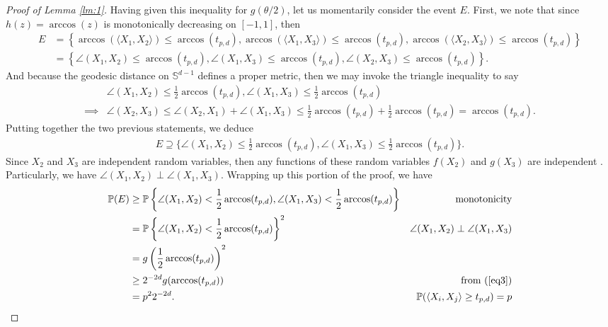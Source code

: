 \documentclass{article}
\begin{document}
\begin{proof}[Proof of Lemma \ref{lm:1}]
Having given this inequality for $g(\theta/2)$, let us momentarily consider the event $E$. First, we note that since $h(z) = \arccos(z)$ is monotonically decreasing on $[-1, 1]$, then
\begin{align*}
    E &= \left\{ \arccos(\langle X_1, X_2 \rangle) \leq \arccos(t_{p,d}), \arccos(\langle X_1, X_3 \rangle) \leq \arccos(t_{p,d}), \arccos(\langle X_2, X_3 \rangle) \leq  \arccos(t_{p,d}) \right\}\\
    &= \left\{ \angle(X_1, X_2) \leq \arccos(t_{p,d}), \angle(X_1, X_3) \leq \arccos(t_{p,d}), \angle(X_2, X_3) \leq  \arccos(t_{p,d}) \right\}.
\end{align*}
And because the geodesic distance on $\mathbb{S}^{d-1}$ defines a proper metric, then we may invoke the triangle inequality to say
\begin{align*}
    &\angle(X_1, X_2) \leq \frac{1}{2}\arccos(t_{p,d}), \angle (X_1, X_3) \leq \frac{1}{2}\arccos(t_{p,d})\\
    \implies & \angle(X_2, X_3) \leq \angle(X_2, X_1) + \angle(X_1, X_3) \leq \frac{1}{2}\arccos(t_{p,d}) + \frac{1}{2}\arccos(t_{p,d}) = \arccos(t_{p,d}).
\end{align*}
Putting together the two previous statements, we deduce
\begin{align*}
    E \supseteq  \{\angle(X_1, X_2) \leq \frac{1}{2}\arccos(t_{p,d}), \angle (X_1, X_3) \leq \frac{1}{2}\arccos(t_{p,d})\}.
\end{align*}
Since $X_2$ and $X_3$ are independent random variables, then any functions of these random variables $f(X_2)$ and $g(X_3)$ are independent \cite{pollard_2001}. Particularly, we have $\angle(X_1, X_2) \perp \angle(X_1, X_3)$. Wrapping up this portion of the proof, we have
\begin{align*}
    \mathbb{P}(E) & \geq \mathbb{P} \left\{ \angle(X_1, X_2) < \frac{1}{2} \arccos(t_{p,d}), \angle(X_1, X_3) < \frac{1}{2} \arccos(t_{p,d}) \right\} & \text{monotonicity}\\
    &= \mathbb{P} \left\{ \angle(X_1, X_2) < \frac{1}{2} \arccos(t_{p,d}) \right\}^2 & \angle(X_1, X_2) \perp \angle(X_1, X_3)\\
    &= g\left(\frac{1}{2} \arccos(t_{p,d}) \right)^2\\
    &\geq 2^{-2d} g(\arccos(t_{p,d})) & \text{from (\ref{eq3})}\\
    &= p^22^{-2d}. & \mathbb{P}(\langle X_i, X_j \rangle \geq t_{p,d}) = p
\end{align*}


\end{proof}
\end{document}
